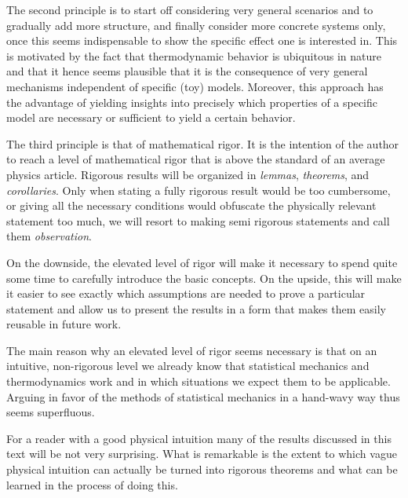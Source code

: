 \documentclass[a4paper,12pt,listof=totoc,index=totoc,bibliography=totoc,headsepline=false,headings=normal,BCOR16.153846mm,DIV12,headinclude,twoside,cleardoublepage=empty,numbers=noenddot,final]{scrreprt}
\theoremstyle{mystyle}
\numberwithin{equation}{section}
\numberwithin{figure}{section}
\numberwithin{lemma}{section}
\numberwithin{theorem}{section}
\numberwithin{corollary}{section}
\numberwithin{definition}{section}
\numberwithin{conjecture}{section}
\numberwithin{observation}{section}
\newcommand{\+}{\mkern2mu}
\DeclareMathOperator{\1}{\mathds{1}}
\begin{document}
The second principle is to start off considering very general scenarios and to gradually add more structure, and finally consider more concrete systems only, once this seems indispensable to show the specific effect one is interested in.
This is motivated by the fact that thermodynamic behavior is ubiquitous in nature and that it hence seems plausible that it is the consequence of very general mechanisms independent of specific (toy) models.
Moreover, this approach has the advantage of yielding insights into precisely which properties of a specific model are necessary or sufficient to yield a certain behavior.

The third principle is that of mathematical rigor.
It is the intention of the author to reach a level of mathematical rigor that is above the standard of an average physics article.
Rigorous results will be organized in \emph{lemmas}, \emph{theorems}, and \emph{corollaries}.
Only when stating a fully rigorous result would be too cumbersome, or giving all the necessary conditions would obfuscate the physically relevant statement too much, we will resort to making semi rigorous statements and call them \emph{observation}.

On the downside, the elevated level of rigor will make it necessary to spend quite some time to carefully introduce the basic concepts.
On the upside, this will make it easier to see exactly which assumptions are needed to prove a particular statement and allow us to present the results in a form that makes them easily reusable in future work.

The main reason why an elevated level of rigor seems necessary is that on an intuitive, non-rigorous level we already know that statistical mechanics and thermodynamics work and in which situations we expect them to be applicable.
Arguing in favor of the methods of statistical mechanics in a hand-wavy way thus seems superfluous.

For a reader with a good physical intuition many of the results discussed in this text will be not very surprising.
What is remarkable is the extent to which vague physical intuition can actually be turned into rigorous theorems and what can be learned in the process of doing this.
\end{document}
